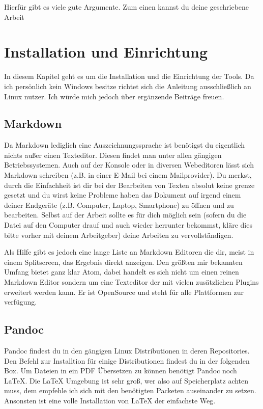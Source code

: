 \documentclass[
    12pt,
    a4paper,
            ngerman,
        bibliography=totocnumbered,
    listof=totocnumbered
]{scrartcl}
\begin{document}
Hierfür gibt es viele gute Argumente. Zum einen kannst du deine
geschriebene Arbeit

\hypertarget{installation-und-einrichtung}{%
\section{Installation und
Einrichtung}\label{installation-und-einrichtung}}

In diesem Kapitel geht es um die Installation und die Einrichtung der
Tools. Da ich persönlich kein Windows besitze richtet sich die Anleitung
ausschließlich an Linux nutzer. Ich würde mich jedoch über ergänzende
Beiträge freuen.

\hypertarget{markdown}{%
\subsection{Markdown}\label{markdown}}

Da Markdown lediglich eine Auszeichnungssprache ist benötigst du
eigentlich nichts außer einen Texteditor. Diesen findet man unter allen
gängigen Betriebssystemen. Auch auf der Konsole oder in diversen
Webeditoren lässt sich Markdown schreiben (z.B. in einer E-Mail bei
einem Mailprovider). Du merkst, durch die Einfachheit ist dir bei der
Bearbeiten von Texten absolut keine grenze gesetzt und du wirst keine
Probleme haben das Dokument auf irgend einem deiner Endgeräte (z.B.
Computer, Laptop, Smartphone) zu öffnen und zu bearbeiten. Selbst auf
der Arbeit sollte es für dich möglich sein (sofern du die Datei auf den
Computer drauf und auch wieder herrunter bekommst, kläre dies bitte
vorher mit deinem Arbeitgeber) deine Arbeiten zu vervollständigen.

Als Hilfe gibt es jedoch eine lange Liste an Markdown Editoren die dir,
meist in einem Splitscreen, das Ergebnis direkt anzeigen. Den größten
mir bekannten Umfang bietet ganz klar Atom, dabei handelt es sich nicht
um einen reinen Markdown Editor sondern um eine Texteditor der mit
vielen zusätzlichen Plugins erweitert werden kann. Er ist OpenSource und
steht für alle Plattformen zur verfügung.

\hypertarget{pandoc}{%
\subsection{Pandoc}\label{pandoc}}

Pandoc findest du in den gängigen Linux Distributionen in deren
Repositories. Den Befehl zur Installtion für einige Distributionen
findest du in der folgenden Box. Um Dateien in ein PDF Übersetzen zu
können benötigt Pandoc noch LaTeX. Die LaTeX Umgebung ist sehr groß, wer
also auf Speicherplatz achten muss, dem empfehle ich sich mit den
benötigten Packeten auseinander zu setzen. Ansonsten ist eine volle
Installation von LaTeX der einfachste Weg.
\end{document}
